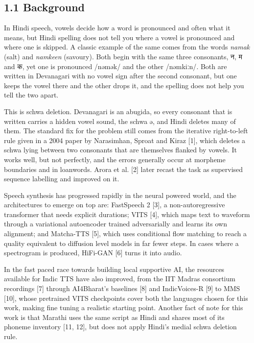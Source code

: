 \documentclass[12pt,a4paper]{article}
\DeclareRobustCommand{\dev}[1]{{\devfont #1}}
\DeclareRobustCommand{\ipa}[1]{{\ipafont #1}}
\begin{document}
\subsection*{1.1  Background}
In Hindi speech, vowels decide how a word is pronounced and often what it means, but Hindi spelling does not tell you where a vowel is pronounced and where one is skipped. A classic example of the same comes from the words \textit{namak} (salt) and \textit{namkeen} (savoury). Both begin with the same three consonants, \dev{न}, \dev{म} and \dev{क}, yet one is pronounced \ipa{/nəmək/} and the other \ipa{/nəmkiːn/}. Both are written in Devanagari with no vowel sign after the second consonant, but one keeps the vowel there and the other drops it, and the spelling does not help you tell the two apart.

This is schwa deletion. Devanagari is an abugida, so every consonant that is written carries a hidden vowel sound, the schwa \ipa{ə}, and Hindi deletes many of them. The standard fix for the problem still comes from the iterative right-to-left rule given in a 2004 paper by Narasimhan, Sproat and Kiraz [1], which deletes a schwa lying between two consonants that are themselves flanked by vowels. It works well, but not perfectly, and the errors generally occur at morpheme boundaries and in loanwords. Arora et al. [2] later recast the task as supervised sequence labelling and improved on it.

Speech synthesis has progressed rapidly in the neural powered world, and the architectures to emerge on top are: FastSpeech 2 [3], a non-autoregressive transformer that needs explicit durations; VITS [4], which maps text to waveform through a variational autoencoder trained adversarially and learns its own alignment; and Matcha-TTS [5], which uses conditional flow matching to reach a quality equivalent to diffusion level models in far fewer steps. In cases where a spectrogram is produced, HiFi-GAN [6] turns it into audio.

In the fast paced race towards building local supportive AI, the resources available for Indic TTS have also improved, from the IIT Madras consortium recordings [7] through AI4Bharat's baselines [8] and IndicVoices-R [9] to MMS [10], whose pretrained VITS checkpoints cover both the languages chosen for this work, making fine tuning a realistic starting point. Another fact of note for this work is that Marathi uses the same script as Hindi and shares most of its phoneme inventory [11, 12], but does not apply Hindi's medial schwa deletion rule.
\end{document}
